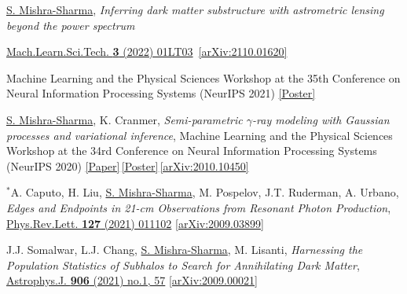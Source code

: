 \documentclass[letterpaper,11pt]{article}
\newenvironment{packed_itemize}{
\begin{itemize}[label=\raisebox{0.25ex}{\tiny$\bullet$}]
  \setlength{\itemsep}{4.2pt}
  \setlength{\parskip}{0pt}
  \setlength{\parsep}{0pt}}{\end{itemize}
}
\newenvironment{packed_enumerate}[1][]{
\begin{etaremune}[#1]
  \setlength{\itemsep}{3.7pt}
  \setlength{\parskip}{0pt}
  \setlength{\parsep}{0pt}}{\end{etaremune}
}
\begin{document}
\begin{packed_enumerate}[start=43]

  \item \underline{S. Mishra-Sharma}, \emph{Inferring dark matter substructure with astrometric lensing beyond the power spectrum}  
  \begin{packed_itemize}
    \item {\href{https://doi.org/10.1088/2632-2153/ac494a}{Mach.Learn.Sci.Tech. \textbf{3} (2022) 01LT03} \,\href{https://arxiv.org/abs/2110.01620}{[arXiv:2110.01620]}}
    \item {{Machine Learning and the Physical Sciences Workshop at the 35th Conference on Neural Information Processing Systems (NeurIPS 2021)} \href{https://ml4physicalsciences.github.io/2021/files/NeurIPS_ML4PS_2021_22_poster.png}{[Poster]}}
    \end{packed_itemize}

  \item\underline{S. Mishra-Sharma}, K. Cranmer, \emph{Semi-parametric $\gamma$-ray modeling with Gaussian processes and variational inference}, {Machine Learning and the Physical Sciences Workshop at the 34rd Conference on Neural Information Processing Systems (NeurIPS 2020)} \href{https://ml4physicalsciences.github.io/2020/files/NeurIPS_ML4PS_2020_20.pdf}{[Paper]}\,\href{https://ml4physicalsciences.github.io/2020/files/NeurIPS_ML4PS_2020_20_poster.pdf}{[Poster]}\,\href{https://arxiv.org/abs/2010.10450}{[arXiv:2010.10450]} 

  \item $^*$A. Caputo, H. Liu, \underline{S. Mishra-Sharma}, M. Pospelov, J.T. Ruderman, A. Urbano, \emph{Edges and Endpoints in 21-cm Observations from Resonant Photon Production},  \href{https://journals.aps.org/prl/abstract/10.1103/PhysRevLett.127.011102}{Phys.Rev.Lett. \textbf{127} (2021) 011102}   \href{https://arxiv.org/abs/2009.03899}{[arXiv:2009.03899]}

  \item J.J. Somalwar, L.J. Chang, \underline{S. Mishra-Sharma}, M. Lisanti, \emph{Harnessing the Population Statistics of Subhalos to Search for Annihilating Dark Matter}, \href{https://iopscience.iop.org/article/10.3847/1538-4357/abc87d}{Astrophys.J. \textbf{906} (2021) no.1, 57} \href{https://arxiv.org/abs/2009.00021}{[arXiv:2009.00021]}


\end{packed_enumerate}
\end{document}
